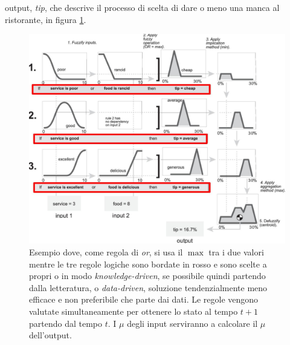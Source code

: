 \documentclass[a4paper,12pt, oneside]{book}
\begin{document}
output, \textit{tip}, che descrive il processo di scelta di dare o meno una
manca al ristorante, in figura \ref{fig:fuze}.
\begin{figure}
  \centering
  \includegraphics[scale = 1]{img/fuze.jpg}
  \caption{Esempio dove, come regola di \textit{or}, si usa il $\max$
    tra i due 
    valori mentre le tre regole logiche sono bordate in rosso e sono scelte a
    propri 
    o in modo \textit{knowledge-driven}, se possibile quindi partendo dalla
    letteratura, o \textit{data-driven}, soluzione tendenzialmente meno efficace
    e non preferibile che parte dai dati. Le regole vengono valutate
    simultaneamente per ottenere lo stato al tempo $t+1$ partendo dal tempo
    $t$. I 
    $\mu$ degli input serviranno a calcolare il $\mu$ dell'output.}
  \label{fig:fuze}
\end{figure}
\newpage
\end{document}
